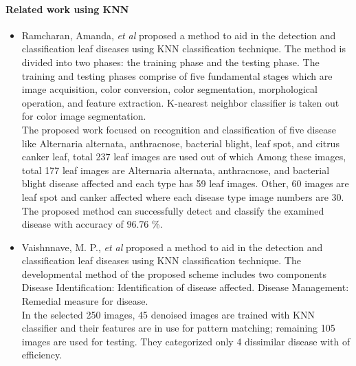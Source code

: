 \paragraph{Related work using KNN}
\begin{itemize}
    \item Ramcharan, Amanda,\textit{ et al} \cite{art12} proposed a method  to aid in the detection and classification leaf diseases using KNN classification technique. The method is divided into two phases: the training phase and the testing phase. The training and testing phases comprise of five fundamental stages which are image acquisition, color conversion, color segmentation, morphological operation, and feature extraction. K-nearest neighbor classifier is taken out for color image segmentation.\vspace{4mm} \\
    The proposed work focused on recognition and classification of five disease like Alternaria alternata, anthracnose, bacterial blight, leaf spot, and citrus canker leaf, total 237 leaf images are used out of which Among these images, total 177 leaf images are Alternaria alternata, anthracnose, and bacterial blight disease affected and each type has 59 leaf images. Other, 60 images are leaf spot and canker affected where each disease type image numbers are 30.\vspace{4mm} \\
    The proposed method can successfully detect and classify the examined disease with accuracy of 96.76 \%.
    \item Vaishnnave, M. P., \textit{et al} \cite{art13} proposed a method  to aid in the detection and classification leaf diseases using KNN classification technique. The developmental method of the proposed scheme includes two components Disease Identification: Identification of disease affected. Disease Management: Remedial measure for disease. \vspace{4mm}\\
    In the selected 250 images, 45 denoised images are trained with KNN classifier and their features are in use for pattern matching; remaining 105 images are used for testing. They categorized only 4 dissimilar disease with of efficiency.

\end{itemize}
